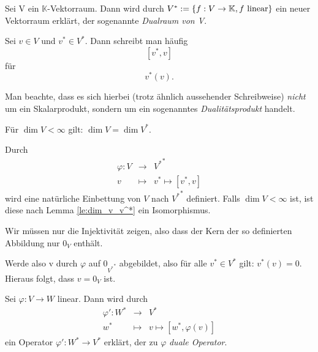 \documentclass[10pt]{scrbook}
\begin{document}
\begin{Def}
Sei V ein $\mathbb{K}$-Vektorraum. Dann wird durch $V^*:=\left\{f: V\rightarrow \mathbb{K}, f\textnormal{ linear}\right\}$ ein neuer Vektorraum erklärt, der sogenannte \emph{Dualraum von V}.
\end{Def}

\begin{Bem}
Sei $v\in V$ und $v^*\in V^*$. Dann schreibt man häufig
\begin{displaymath}
\left[v^*, v\right]
\end{displaymath}
für
\begin{displaymath}
v^*(v).
\end{displaymath}

Man beachte, dass es sich hierbei (trotz ähnlich aussehender Schreibweise) \emph{nicht} um ein Skalarprodukt, sondern um ein sogenanntes \emph{Dualitätsprodukt} handelt.
\end{Bem}


\begin{Le}
\label{le:dim_v_v^*}
Für $\dim V<\infty$ gilt: $\dim V=\dim V^*$.
\end{Le}

\begin{Le}
Durch
\begin{eqnarray*}
\varphi: V & \rightarrow & {V^*}^* \\
v & \mapsto & v^* \mapsto \left[v^*, v\right]
\end{eqnarray*}
wird eine natürliche Einbettung von $V$ nach ${V^*}^*$ definiert. Falls $\dim V<\infty$ ist, ist diese nach Lemma \ref{le:dim_v_v^*} ein Isomorphismus.
\end{Le}
\begin{bew}
Wir müssen nur die Injektivität zeigen, also dass der Kern der so definierten Abbildung nur $0_V$ enthält.

Werde also v durch $\varphi$ auf $0_{{V^*}^*}$ abgebildet, also für alle $v^*\in V^*$ gilt: $v^*(v)=0$. Hieraus folgt, dass $v=0_V$ ist.
\end{bew}

\begin{Def}
Sei $\varphi: V\rightarrow W$ linear. Dann wird durch
\begin{eqnarray*}
\varphi': W^* & \rightarrow & V^* \\
w^* & \mapsto & v \mapsto \left[w^*, \varphi(v)\right]
\end{eqnarray*}
ein Operator $\varphi': W^* \rightarrow V^*$ erklärt, der zu $\varphi$ \emph{duale Operator}.
\end{Def}
\end{document}
